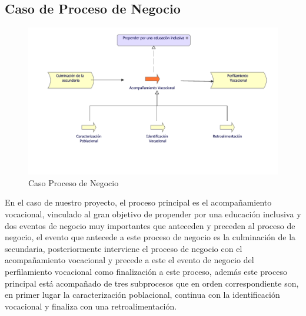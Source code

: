 \subsection{Caso  de Proceso de Negocio}
\begin{figure}[h!]
	\centering
	\includegraphics[width=.9\linewidth]{imgs/caso/negocio/ProcesoNegocio}
	\caption{Caso Proceso de Negocio}
\end{figure}

En el caso de nuestro proyecto, el proceso principal es el acompañamiento vocacional, vinculado al gran objetivo de propender por una educación inclusiva y dos eventos de negocio muy importantes que anteceden y preceden al proceso de negocio, el evento que antecede a este proceso de negocio es la culminación de la secundaria, posteriormente interviene el proceso de negocio con el acompañamiento vocacional y precede a este el evento de negocio del perfilamiento vocacional como finalización a este proceso, además este proceso principal está acompañado de tres subprocesos que en orden correspondiente son, en primer lugar la caracterización poblacional, continua con la identificación vocacional y finaliza con una retroalimentación.